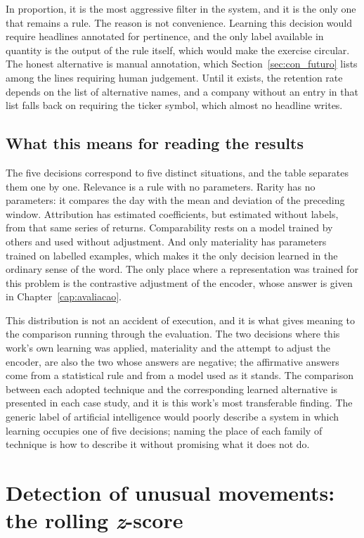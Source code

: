 In proportion, it is the most aggressive filter in the system, and it is the only one that
remains a rule. The reason is not convenience. Learning this decision would require headlines
annotated for pertinence, and the only label available in quantity is the output of the rule
itself, which would make the exercise circular. The honest alternative is manual annotation,
which Section~\ref{sec:con_futuro} lists among the lines requiring human judgement. Until it
exists, the retention rate depends on the list of alternative names, and a company without an
entry in that list falls back on requiring the ticker symbol, which almost no headline writes.

\subsection*{What this means for reading the results}

The five decisions correspond to five distinct situations, and the table separates them one by
one. Relevance is a rule with no parameters. Rarity has no parameters: it compares the day with
the mean and deviation of the preceding window. Attribution has estimated coefficients, but
estimated without labels, from that same series of returns. Comparability rests on a model
trained by others and used without adjustment. And only materiality has parameters trained on
labelled examples, which makes it the only decision learned in the ordinary sense of the word. The only place where a representation was trained for
this problem is the contrastive adjustment of the encoder, whose answer is given in
Chapter~\ref{cap:avaliacao}.

This distribution is not an accident of execution, and it is what gives meaning to the
comparison running through the evaluation. The two decisions where this work's own learning was
applied, materiality and the attempt to adjust the encoder, are also the two whose answers are
negative; the affirmative answers come from a statistical rule and from a model used as it
stands. The comparison between each adopted technique and the corresponding learned alternative
is presented in each case study, and it is this work's most transferable finding. The generic
label of artificial intelligence would poorly describe a system in which learning occupies one
of five decisions; naming the place of each family of technique is how to describe it without
promising what it does not do.

\section{Detection of unusual movements: the rolling \emph{z}-score}
\label{sec:met_detecao}

